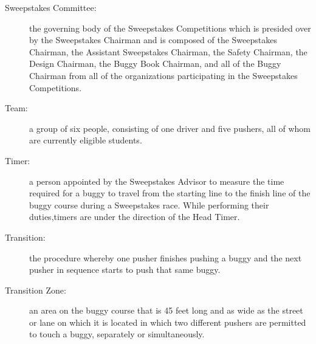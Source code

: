 \begin{description}
	\item[Sweepstakes Committee:]
	the governing body of the Sweepstakes Competitions which is presided over by the Sweepstakes Chairman and is composed of the Sweepstakes Chairman, the Assistant Sweepstakes Chairman, the Safety Chairman, the Design Chairman, the Buggy Book Chairman, and all of the Buggy Chairman from all of the organizations participating in the Sweepstakes Competitions.

	\item[Team:]
	a group of six people, consisting of one driver and five pushers, all of whom are currently eligible students.

	\item[Timer:]
	a person appointed by the Sweepstakes Advisor to measure the time required for a buggy to travel from the starting line to the finish line of the buggy course during a Sweepstakes race. While performing their duties,timers are under the direction of the Head Timer.

	\item[Transition:]
	the procedure whereby one pusher finishes pushing a buggy and the next pusher in sequence starts to push that same buggy.

	\item[Transition Zone:]
	an area on the buggy course that is 45 feet long and as wide as the street or lane on which it is located in which two different pushers are permitted to touch a buggy, separately or simultaneously.

\end{description}

